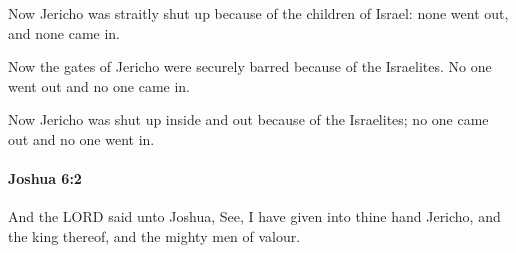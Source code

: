 			\begin{versebox}
					\item[BHS] 
					\item[ASV] Now Jericho was straitly shut up because of the children of Israel: none went out, and none came in.
					\item[NIV] Now the gates of Jericho were securely barred because of the Israelites. No one went out and no one came in.
					\item[NRSV] Now Jericho was shut up inside and out because of the Israelites; no one came out and no one went in.
			\end{versebox}

		\paragraph{Joshua 6:2} %
			\label{JOSHUA-6-2}

			And the LORD said unto Joshua, See, I have given into thine hand Jericho, and the king thereof, and the mighty men of valour.

